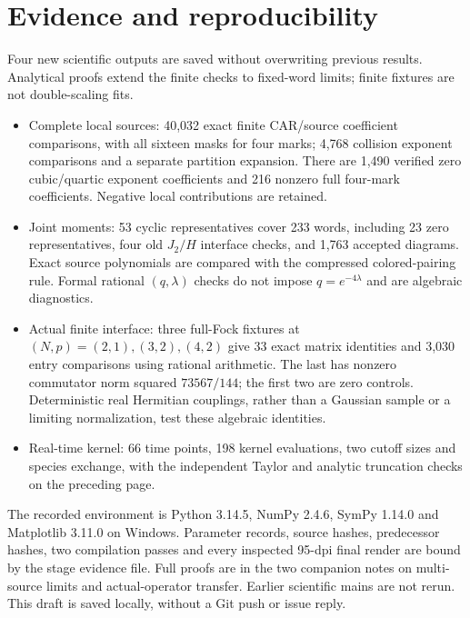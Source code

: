 \documentclass[11pt]{article}
\begin{document}
\newpage
\section{Evidence and reproducibility}
Four new scientific outputs are saved without overwriting previous
results. Analytical proofs extend the finite checks to fixed-word
limits; finite fixtures are not double-scaling fits.
\begin{itemize}
\item Complete local sources: 40,032 exact finite CAR/source coefficient
comparisons, with all sixteen masks for four marks; 4,768 collision
exponent comparisons and a separate partition expansion. There are
1,490 verified zero cubic/quartic exponent coefficients and 216
nonzero full four-mark coefficients. Negative local contributions
are retained.
\item Joint moments: 53 cyclic representatives cover 233 words,
including 23 zero representatives, four old $J_2/H$ interface checks,
and 1,763 accepted diagrams. Exact source polynomials are compared
with the compressed colored-pairing rule. Formal rational $(q,\lambda)$
checks do not impose $q=e^{-4\lambda}$ and are algebraic diagnostics.
\item Actual finite interface: three full-Fock fixtures at
$(N,p)=(2,1),(3,2),(4,2)$ give 33 exact matrix identities and 3,030
entry comparisons using rational arithmetic. The last has nonzero
commutator norm squared $73567/144$; the first two are zero controls.
Deterministic real Hermitian couplings, rather than a Gaussian
sample or a limiting normalization, test these algebraic identities.
\item Real-time kernel: 66 time points, 198 kernel evaluations,
two cutoff sizes and species exchange, with the independent Taylor
and analytic truncation checks on the preceding page.
\end{itemize}
The recorded environment is Python 3.14.5, NumPy 2.4.6, SymPy 1.14.0
and Matplotlib 3.11.0 on Windows. Parameter records, source hashes,
predecessor hashes, two compilation passes and every inspected
95-dpi final render are bound by the stage evidence file. Full
proofs are in the two companion notes on multi-source limits and
actual-operator transfer. Earlier scientific mains are not rerun.
This draft is saved locally, without a Git push or issue reply.
\end{document}
